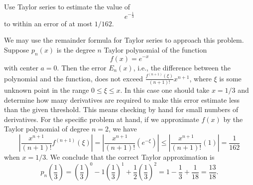 \documentclass{ximera}
\begin{document}
\begin{question}%

Use Taylor series to estimate the value of
\[e^{-\frac{1}{3}}\] to within an error of at most \(1/162\).
\begin{multiplechoice}
\end{multiplechoice}
\begin{feedback}
We may use the remainder formula for Taylor series to approach this problem.
Suppose \(p_n(x)\) is the degree \(n\) Taylor polynomial of the function
\[ f(x) = e^{-x}\]
with center \(a=0\). Then the error \(E_n(x)\), i.e., the difference between the polynomial and the function, does not exceed \(\frac{f^{(n+1)}(\xi)}{(n+1)!}x^{n+1}\), where \(\xi\) is some unknown point  in the range \(0 \leq \xi \leq x\). In this case one should take \(x = 1/3\) and determine how many derivatives are required to make this error estimate less than the given threshold. This means checking by hand for small numbers of derivatives. For the specific problem at hand, if we approximate \(f(x)\) by the Taylor polynomial of degree \( n = 2\), we have 
\[ \left| \frac{x^{n+1} }{(n+1)!} f^{(n+1)}(\xi) \right| = \left| \frac{x^{n+1}}{(n+1)!} \left( e^{-\xi} \right) \right| \leq \left| \frac{x^{n+1}}{(n+1)!} \left( 1 \right) \right| = \frac{1}{162} \] when \(x = 1/3\).
We conclude that the correct Taylor approximation is
\[ p_n \left( \frac{1}{3}\right) =  \left(\frac{1}{3}\right)^{0} -1\left(\frac{1}{3}\right)^{1} + \frac{1}{2}\left(\frac{1}{3}\right)^{2} =  1 -\frac{1}{3} + \frac{1}{18} = \frac{13}{18}.\]
\end{feedback}

\end{question}
\end{document}
